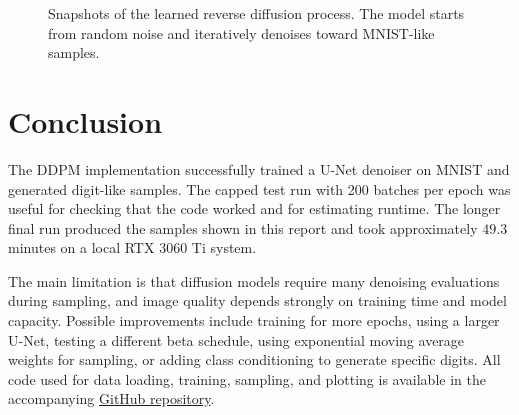 \begin{figure}[H]
    \centering
    \caption{Snapshots of the learned reverse diffusion process. The model starts from random noise and iteratively denoises toward MNIST-like samples.}
    \label{fig:reverse-snapshots}
\end{figure}
\FloatBarrier

\section{Conclusion}

The DDPM implementation successfully trained a U-Net denoiser on MNIST and generated digit-like samples.
The capped test run with 200 batches per epoch was useful for checking that the code worked and for estimating runtime.
The longer final run produced the samples shown in this report and took approximately \(49.3\) minutes on a local RTX 3060 Ti system.

The main limitation is that diffusion models require many denoising evaluations during sampling, and image quality depends strongly on training time and model capacity.
Possible improvements include training for more epochs, using a larger U-Net, testing a different beta schedule, using exponential moving average weights for sampling, or adding class conditioning to generate specific digits.
All code used for data loading, training, sampling, and plotting is available in the accompanying
\href{https://github.com/AkramAki/Advanced_DeepLearning_Seminar}{GitHub repository}.

\printbibliography

